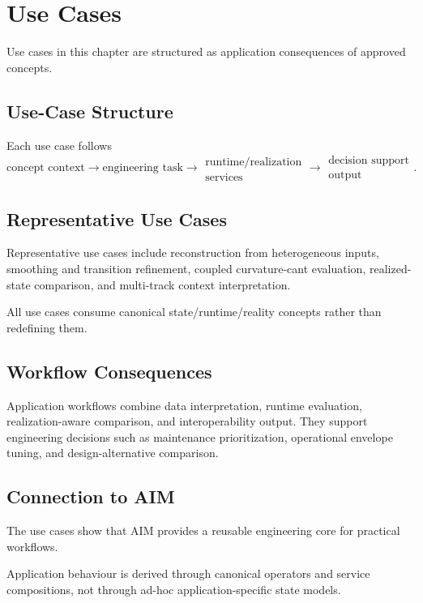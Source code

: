 
\chapter{Use Cases}

\label{chap:applications-use-cases}

Use cases in this chapter are structured as application consequences of
approved concepts.

\section{Use-Case Structure}

Each use case follows
\[
\text{concept context}
\rightarrow
\text{engineering task}
\rightarrow
\substack{\text{runtime/realization}\\\text{services}}
\rightarrow
\substack{\text{decision support}\\\text{output}}.
\]

\section{Representative Use Cases}

Representative use cases include reconstruction from heterogeneous
inputs, smoothing and transition refinement, coupled curvature-cant
evaluation, realized-state comparison, and multi-track context
interpretation.

All use cases consume canonical state/runtime/reality concepts rather
than redefining them.

\section{Workflow Consequences}

Application workflows combine data interpretation, runtime evaluation,
realization-aware comparison, and interoperability output. They support
engineering decisions such as maintenance prioritization, operational
envelope tuning, and design-alternative comparison.

\section{Connection to AIM}

\begin{summary}
The use cases show that AIM provides a reusable engineering core for
practical workflows.

Application behaviour is derived through canonical operators and service
compositions, not through ad-hoc application-specific state models.
\end{summary}
